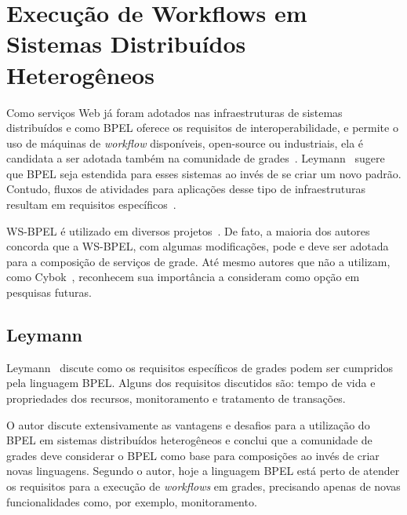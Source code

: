 \documentclass[12pt]{report} %
\begin{document}
%   
% 
% 

    \section{Execução de Workflows em Sistemas Distribuídos Heterogêneos}
    \label{sec:RelatedWF}
	Como serviços Web já foram adotados nas infraestruturas de sistemas distribuídos e como BPEL oferece os requisitos de interoperabilidade, e permite o uso de máquinas de \textit{workflow} disponíveis, open-source ou industriais, ela é candidata a ser adotada também na comunidade de grades~\cite{Khalaf06}.
	Leymann~\cite{Leymann06} sugere que BPEL seja estendida para esses sistemas ao invés de se criar um novo padrão.
	Contudo, fluxos de atividades para aplicações desse tipo de infraestruturas resultam em requisitos específicos~\cite{Leymann06}. 

	WS-BPEL é utilizado em diversos projetos~\cite{Emmerich05,GridServiceComposition08,Leymann06,GridEnabledWF08,Slomiski06}.
	De fato, a maioria dos autores concorda que a WS-BPEL, com algumas modificações, pode e deve ser adotada para a composição de serviços de grade.
	Até mesmo autores que não a utilizam, como Cybok~\cite{Dieter06}, reconhecem sua importância a consideram como opção em pesquisas futuras.
  
	\subsection{Leymann}
	    Leymann~\cite{Leymann06} discute como os requisitos específicos de grades podem ser cumpridos pela linguagem BPEL.
	    Alguns dos requisitos discutidos são: tempo de vida e propriedades dos recursos, monitoramento e tratamento de transações.
	    
	    O autor discute extensivamente as vantagens e desafios para a utilização do BPEL em sistemas distribuídos heterogêneos e conclui que a comunidade de grades deve considerar o BPEL como base para composições ao invés de criar novas linguagens.
	    Segundo o autor, hoje a linguagem BPEL está perto de atender os requisitos para a execução de \textit{workflows}  em grades, precisando apenas de novas funcionalidades como, por exemplo, monitoramento.
\end{document}
